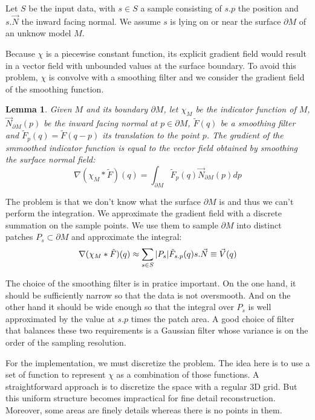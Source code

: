 \documentclass[a4paper]{article}
\begin{document}
Let $S$ be the input data, with $s \in S$ a sample consisting of $s.p$ the position and $s.\vec{N}$ the inward facing normal. We assume $s$ is lying on or near the surface $\partial M$ of an unknow model $M$.

Because $\chi$ is a piecewise constant function, its explicit gradient field would result in a vector field with unbounded values at the surface boundary. To avoid this problem, $\chi$ is convolve with a smoothing filter and we consider the gradient field of the smoothing function.

\newtheorem{lemma}{Lemma}
\begin{lemma}
Given $M$ and its boundary $\partial M$, let $\chi_M$ be the indicator function of $M$, $\vec{N}_{\partial M}(p)$ be the inward facing normal at $p \in \partial M$, $\tilde{F}(q)$ be a smoothing filter and $\tilde{F}_p(q) = \tilde{F}(q-p)$ its translation to the point $p$. The gradient of the smmoothed indicator function is equal to the vector field obtained by smoothing the surface normal field:
$$\nabla(\chi_M * \tilde{F})(q) = \int_{\partial M} \tilde{F}_p(q) \vec{N}_{\partial M}(p) dp$$
\end{lemma}

The problem is that we don't know what the surface $\partial M$ is and thus we can't perform the integration. We approximate the gradient field with a discrete summation on the sample points. We use them to sample $\partial M$ into distinct patches $P_s \subset \partial M$ and approximate the integral:
$$\nabla(\chi_M * \tilde{F})(q) \approx \sum_{s \in S} \\|P_s\\| \tilde{F}_{s.p}(q) s.\vec{N} \equiv \vec{V}(q)$$

The choice of the smoothing filter is in pratice important. On the one hand, it should be sufficiently narrow so that the data is not oversmooth. And on the other hand it should be wide enough so that the integral over $P_s$ is well approximated by the value at $s.p$ times the patch area. A good choice of filter that balances these two requirements is a Gaussian filter whose variance is on the order of the sampling resolution.

For the implementation, we must discretize the problem. The idea here is to use a set of function to represent $\chi$ as a combination of those functions. A straightforward approach is to discretize the space with a regular 3D grid. But this uniform structure becomes impractical for fine detail reconstruction. Moreover, some areas are finely details whereas there is no points in them.
\end{document}
